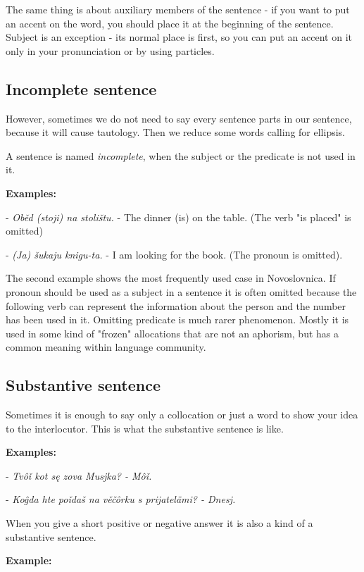 The same thing is about auxiliary members of the sentence - if you want to put an accent on the word, you should place it at the beginning of the sentence. Subject is an exception - its normal place is first, so you can put an accent on it only in your pronunciation or by using particles.

\subsection{Incomplete sentence}

However, sometimes we do not need to say every sentence parts in our sentence, because it will cause tautology. Then we reduce some words calling for ellipsis.

A sentence is named \textit{incomplete}, when the subject or the predicate is not used in it.

\textbf{Examples:}

- \textit{Oběd (stoji) na stolištu.} - The dinner (is) on the table. (The verb "is placed" is omitted)

- \textit{(Ja) šukaju knigu-ta.} - I am looking for the book. (The pronoun is omitted).

The second example shows the most frequently used case in Novoslovnica. If pronoun should be used as a subject in a sentence it is often omitted because the following verb can represent the information about the person and the number has been used in it. Omitting predicate is much rarer phenomenon. Mostly it is used in some kind of "frozen" allocations that are not an aphorism, but has a common meaning within language community.

\subsection{Substantive sentence}

Sometimes it is enough to say only a collocation or just a word to show your idea to the interlocutor. This is what the substantive sentence is like.

\textbf{Examples:}

- \textit{Tvôǐ kot sę zova Musjka? - Môǐ.}

- \textit{Koĝda hte poǐdaš na věčôrku s prijatelämi? - Dnesj.}

When you give a short positive or negative answer it is also a kind of a substantive sentence.

\textbf{Example:}

